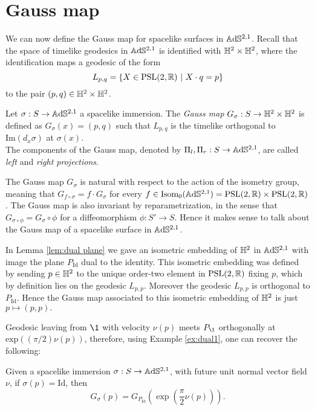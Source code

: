 \section{Gauss map} \label{sec:gauss map}
We can now define the Gauss map for spacelike surfaces in $\mathbb{A}\mathrm{d}\mathbb{S}^{2,1}$. Recall that the space of timelike geodesics in $\mathbb{A}\mathrm{d}\mathbb{S}^{2,1}$ is identified with $\mathbb{H}^2\times\mathbb{H}^2$, where the identification maps a geodesic of the form
\[
    L_{p,q}=\{ X \in\text{PSL}(2,\mathbb{R}) \ | \ X \cdot q = p \}
\]
to the pair $(p,q) \in \mathbb{H}^2\times\mathbb{H}^2$. 
\begin{definition}
    Let $\sigma :S \to\mathbb{A}\mathrm{d}\mathbb{S}^{2,1}$ a spacelike immersion. The \textit{Gauss map} $G_\sigma : S \to \mathbb{H}^2 \times \mathbb{H}^2$ is defined as $G_\sigma(x) = (p,q)$ such that $L_{p,q}$ is the timelike orthogonal to $\text{Im}(d_x\sigma)$ at $\sigma(x)$.\\
    The components of the Gauss map, denoted by $\Pi_l, \Pi_r : S \to \mathbb{A}\mathrm{d}\mathbb{S}^{2,1}$, are called \textit{left} and \textit{right projections}. 
\end{definition}
The Gauss map $G_\sigma$ is natural with respect to the action of the isometry group, meaning that $G_{f\circ\sigma} = f \cdot G_\sigma$ for every $f \in\text{Isom}_0(\mathbb{A}\mathrm{d}\mathbb{S}^{2,1}) = \text{PSL}(2,\mathbb{R})\times\text{PSL}(2,\mathbb{R})$. The Gauss map is also invariant by reparametrization, in the sense that $G_{\sigma \circ \phi} = G_\sigma \circ \phi$ for a diffeomorphism $\phi:S'\to S$. Hence it makes sense to talk about the Gauss map of a spacelike surface in $\mathbb{A}\mathrm{d}\mathbb{S}^{2,1}$.

\begin{example}\label{ex:dual1}
    In Lemma \ref{lem:dual plane} we gave an isometric embedding of $\mathbb{H}^2$ in $\mathbb{A}\mathrm{d}\mathbb{S}^{2,1}$ with image the plane $P_{\text{Id}}$ dual to the identity. This isometric embedding was defined by sending $p\in\mathbb{H}^2$ to the unique order-two element in $\text{PSL}(2,\mathbb{R})$ fixing $p$, which by definition lies on the geodesic $L_{p,p}$. Moreover the geodesic $L_{p,p}$ is orthogonal to $P_{\text{Id}}$. Hence the Gauss map associated to this isometric embedding of $\mathbb{H}^2$ is just $p\mapsto (p,p).$
\end{example}
Geodesic leaving from $\1$ with velocity $\nu(p)$ meets $P_\1$ orthogonally at $\text{exp}((\pi/2)\nu(p))$, therefore, using Example \ref{ex:dual1}, one can recover the following:

\begin{lemma}\label{lem:Gaussid}
    Given a spacelike immersion $\sigma:S\to\mathbb{A}\mathrm{d}\mathbb{S}^{2,1}$, with future unit normal vector field $\nu$, if $\sigma(p)=\text{Id}$, then 
    \begin{equation}\label{eq:Gaussid}
        G_\sigma(p)=G_{P_\text{Id}}(\exp(\frac{\pi}{2}\nu(p))).
    \end{equation}
\end{lemma}

